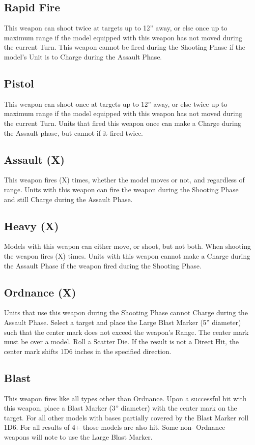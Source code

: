 \subsection{Rapid Fire}
This weapon can shoot twice at targets up to 12” away, or else
once up to maximum range if the model equipped with this
weapon has not moved during the current Turn. This weapon
cannot be fired during the Shooting Phase if the model’s Unit
is to Charge during the Assault Phase.


\subsection{Pistol}
This weapon can shoot once at targets up to 12” away, or else
twice up to maximum range if the model equipped with this
weapon has not moved during the current Turn. Units that fired
this weapon once can make a Charge during the Assault
phase, but cannot if it fired twice.

\subsection{Assault (X)}
This weapon fires (X) times, whether the model moves or not,
and regardless of range. Units with this weapon can fire the
weapon during the Shooting Phase and still Charge during the
Assault Phase.

\subsection{Heavy (X)}
Models with this weapon can either move, or shoot, but not
both. When shooting the weapon fires (X) times. Units with this
weapon cannot make a Charge during the Assault Phase if the
weapon fired during the Shooting Phase.



\subsection{Ordnance (X)}
Units that use this weapon during the Shooting Phase cannot
Charge during the Assault Phase. Select a target and place
the Large Blast Marker (5” diameter) such that the center mark
does not exceed the weapon’s Range. The center mark must
be over a model. Roll a Scatter Die. If the result is not a Direct
Hit, the center mark shifts 1D6 inches in the specified
direction.


\subsection{Blast}
This weapon fires like all types other than Ordnance. Upon a
successful hit with this weapon, place a Blast Marker (3”
diameter) with the center mark on the target. For all other
models with bases partially covered by the Blast Marker roll
1D6. For all results of 4+ those models are also hit. Some non-
Ordnance weapons will note to use the Large Blast Marker.


